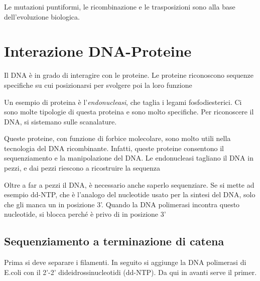 Le mutazioni puntiformi, le ricombinazione e le trasposizioni sono alla base dell'evoluzione biologica.

\section{Interazione DNA-Proteine}

Il DNA è in grado di interagire con le proteine. Le proteine riconoscono sequenze specifiche su cui posizionarsi per svolgere poi la loro funzione


Un esempio di proteina è l'\emph{endonucleasi}, che taglia i legami fosfodiesterici. Ci sono molte tipologie di questa proteina e sono molto specifiche. Per riconoscere il DNA, si sistemano sulle scanalature.


Queste proteine, con funzione di forbice molecolare, sono molto utili nella tecnologia del DNA ricombinante. Infatti, queste proteine consentono il sequenziamento e la manipolazione del DNA.
Le endonucleasi tagliano il DNA in pezzi, e dai pezzi riescono a ricostruire la sequenza



Oltre a far a pezzi il DNA, è necessario anche saperlo sequenziare. Se si mette ad esempio dd-NTP, che è l'analogo del nucleotide usato per la sintesi del DNA, solo che gli manca un  in posizione 3'.
Quando la DNA polimerasi incontra questo nucleotide, si blocca perché è privo di  in posizione 3'

\clearpage

\subsection{Sequenziamento a terminazione di catena}

Prima si deve separare i filamenti. In seguito si aggiunge la DNA polimerasi di E.coli con il 2'-2' dideidrossinucleotidi (dd-NTP). Da qui in avanti serve il primer.



